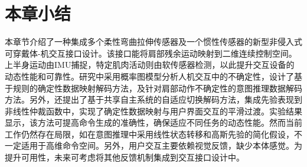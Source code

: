 \section{本章小结}本章节介绍了一种集成多个柔性弯曲拉伸传感器及一个惯性传感器的新型非侵入式可穿戴体-机交互接口设计。该接口能将肩部残余运动映射到二维连续控制空间。上半身运动由IMU捕捉，特定肌肉活动则由软传感器检测，以此提升交互设备的动态性能和可靠性。研究中采用概率图模型分析人机交互中的不确定性，设计了基于规则的确定性数据映射解码方法，及针对肩部动作不确定性的意图推理数据解码方法。另外，还提出了基于共享自主系统的自适应切换解码方法，集成先验表现到非线性仲裁函数中，实现了确定性数据映射与用户界面交互的平滑过渡。实验结果显示，该方法可提高命令生成的准确性，确保适应不同任务的动态性能。然而当前工作仍然存在局限，如在意图推理中采用线性状态转移和高斯先验的简化假设，不一定适用于高维命令空间。另外，用户交互主要依赖视觉反馈，缺少本体感觉。为提升可用性，未来可考虑将其他反馈机制集成到交互接口设计中。
